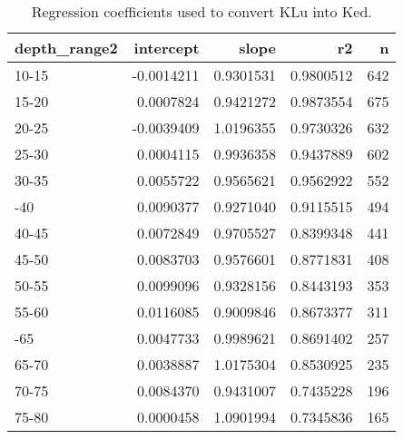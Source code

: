 \begin{table}[!h]

\caption{\label{tab:}Regression coefficients used to convert KLu into Ked.}
\centering
\begin{tabular}[t]{lrrrr}
\toprule
depth\_range2 & intercept & slope & r2 & n\\
\midrule
10-15 & -0.0014211 & 0.9301531 & 0.9800512 & 642\\
15-20 & 0.0007824 & 0.9421272 & 0.9873554 & 675\\
20-25 & -0.0039409 & 1.0196355 & 0.9730326 & 632\\
25-30 & 0.0004115 & 0.9936358 & 0.9437889 & 602\\
30-35 & 0.0055722 & 0.9565621 & 0.9562922 & 552\\
\addlinespace
35-40 & 0.0090377 & 0.9271040 & 0.9115515 & 494\\
40-45 & 0.0072849 & 0.9705527 & 0.8399348 & 441\\
45-50 & 0.0083703 & 0.9576601 & 0.8771831 & 408\\
50-55 & 0.0099096 & 0.9328156 & 0.8443193 & 353\\
55-60 & 0.0116085 & 0.9009846 & 0.8673377 & 311\\
\addlinespace
60-65 & 0.0047733 & 0.9989621 & 0.8691402 & 257\\
65-70 & 0.0038887 & 1.0175304 & 0.8530925 & 235\\
70-75 & 0.0084370 & 0.9431007 & 0.7435228 & 196\\
75-80 & 0.0000458 & 1.0901994 & 0.7345836 & 165\\
\bottomrule
\end{tabular}
\end{table}
